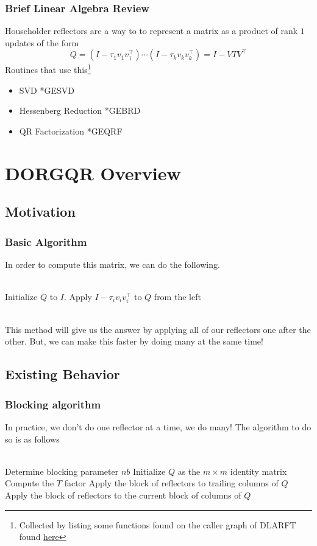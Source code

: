 \documentclass[12pt,aspectratio=169]{beamer}
\begin{document}
    \begin{frame}
        \frametitle{Brief Linear Algebra Review}
        Householder reflectors are a way to to represent a matrix as a product of rank $1$ updates of the form
        $$
            Q = \left(I - \tau_1 v_1v_1^\top\right)\cdots\left(I - \tau_k v_kv_k^\top\right) = I - VTV^\top
        $$
        Routines that use this\footnote{Collected by listing some functions found on the caller graph of DLARFT found \textcolor{blue}{\href{https://netlib.org/lapack/explore-html//d7/d0d/group__larft_ga20e5a4f351b3ca7d30078547e55884f5_ga20e5a4f351b3ca7d30078547e55884f5_icgraph_org.svg}{here}}}
        \begin{itemize}
            \item SVD *GESVD
            \item Hessenberg Reduction *GEBRD
            \item QR Factorization *GEQRF
        \end{itemize}
    \end{frame}
    \section{DORGQR Overview}
    \subsection{Motivation}
    \begin{frame}
        \frametitle{Basic Algorithm}
            In order to compute this matrix, we can do the following.\\\,\\
        \begin{algorithmic}[1]
            \State Initialize $Q$ to $I$.
            \State Apply $I-\tau_iv_iv_i^\top$ to $Q$ from the left
            \EndFor
        \end{algorithmic}\,\\
        This method will give us the answer by applying all of our reflectors one after the other. But, we can make this 
        faster by doing many at the same time!
    \end{frame}
    \subsection{Existing Behavior}
    \begin{frame}
        \frametitle{Blocking algorithm}
        In practice, we don't do one reflector at a time, we do many! The algorithm to do so is as follows\\\,\\
        \begin{algorithmic}[1]
            \State Determine blocking parameter $nb$
            \State Initialize $Q$ as the $m\times m$ identity matrix
            \State Compute the $T$ factor
            \State Apply the block of reflectors to trailing columns of $Q$
            \State Apply the block of reflectors to the current block of columns of $Q$
            \EndFor
        \end{algorithmic}
    \end{frame}
\end{document}
